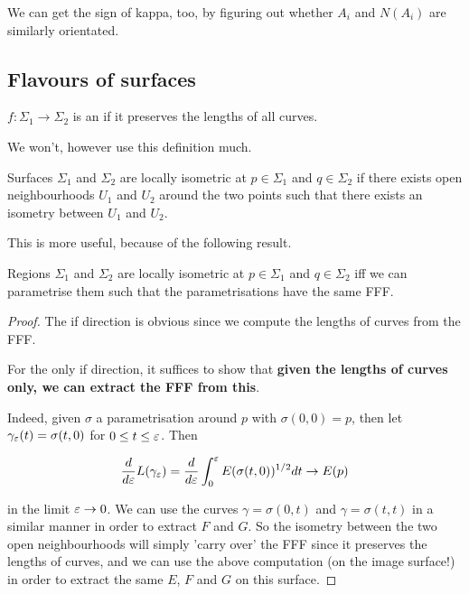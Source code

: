 \documentclass[11pt]{scrartcl}
\begin{document}
\begin{remark}
    We can get the sign of kappa, too, by figuring out whether $A_i$ and $N(A_i)$ are similarly orientated.
\end{remark}

\subsection{Flavours of surfaces} %

\begin{definition}
$f : \Sigma_1 \to \Sigma_2$ is an  if it preserves the lengths of all curves.
\end{definition}

We won't, however use this definition much.

\begin{definition}
Surfaces $\Sigma_1$ and $\Sigma_2$ are locally isometric at $p \in \Sigma_1$ and $q \in \Sigma_2$ if there exists open neighbourhoods $U_1$ and $U_2$ around the two points such that there exists an isometry between $U_1$ and $U_2$.
\end{definition}

This is more useful, because of the following result.

\begin{proposition}

Regions $\Sigma_1$ and $\Sigma_2$ are locally isometric at $p \in \Sigma_1$ and $q \in \Sigma_2$ iff we can parametrise them such that the parametrisations have the same FFF.

\begin{proof}
    The if direction is obvious since we compute the lengths of curves from the FFF.

    For the only if direction, it suffices to show that \textbf{given the lengths of curves only, we can extract the FFF from this}.

    Indeed, given $\sigma$ a parametrisation around $p$ with $\sigma(0,0)=p$, then let $\gamma_\varepsilon(t) = \sigma(t,0)$ for $0 \le t \le \varepsilon$. Then

    \begin{equation}
        \frac{d}{d \varepsilon} L(\gamma_\varepsilon) = \frac{d}{d\varepsilon} \int_0^\varepsilon E(\sigma(t,0))^{1/2} dt \to E(p)
    \end{equation}

    in the limit $\varepsilon \to 0$. We can use the curves $\gamma = \sigma(0,t)$ and $\gamma = \sigma(t,t)$ in a similar manner in order to extract $F$ and $G$. So the isometry between the two open neighbourhoods will simply 'carry over' the FFF since it preserves the lengths of curves, and we can use the above computation (on the image surface!) in order to extract the same $E$, $F$ and $G$ on this surface.
\end{proof}

\end{proposition}
\end{document}
